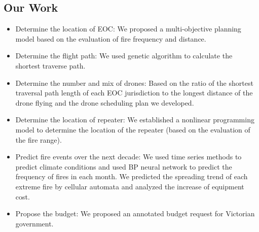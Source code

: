 \documentclass{mcmthesis}
\begin{document}
\subsection{Our Work}
\begin{itemize}
\item Determine the location of EOC: We proposed a multi-objective planning model based on the evaluation of fire frequency and distance.

\item Determine the flight path: We used genetic algorithm to calculate the shortest traverse path.

\item Determine the number and mix of drones:  Based on the ratio of the shortest traversal path length of each EOC jurisdiction to the longest distance of the drone flying and the drone scheduling plan we developed.

\item Determine the location of repeater: We established a nonlinear programming model to determine the location of the repeater (based on the evaluation of the fire range).

\item Predict fire events over the next decade: We used time series methods to predict climate conditions and used BP neural network to predict the frequency of fires in each month. We predicted the spreading trend of each extreme fire by cellular automata and analyzed the increase of equipment cost.

\item Propose the budget: We proposed an annotated budget request for Victorian government.
\end{itemize}
\end{document}
